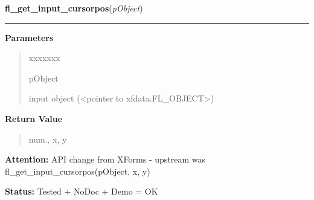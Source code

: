 \hspace{.8\funcindent}\begin{boxedminipage}{\funcwidth}

    \raggedright \textbf{fl\_get\_input\_cursorpos}(\textit{pObject})

    \vspace{-1.5ex}

    \rule{\textwidth}{0.5\fboxrule}
\setlength{\parskip}{2ex}
\setlength{\parskip}{1ex}
      \textbf{Parameters}
      \vspace{-1ex}

      \begin{quote}
        \begin{Ventry}{xxxxxxx}

          \item[pObject]

          input object ({\textless}pointer to 
          xfdata.FL\_OBJECT{\textgreater})

        \end{Ventry}

      \end{quote}

      \textbf{Return Value}
    \vspace{-1ex}

      \begin{quote}
      num., x, y

      \end{quote}

\textbf{Attention:} API change from XForms - upstream was fl\_get\_input\_cursorpos(pObject, x,
y)



\textbf{Status:} Tested + NoDoc + Demo = OK



    \end{boxedminipage}

    \label{xformslib:library:fl_set_input_cursor_visible}

    \vspace{0.5ex}


